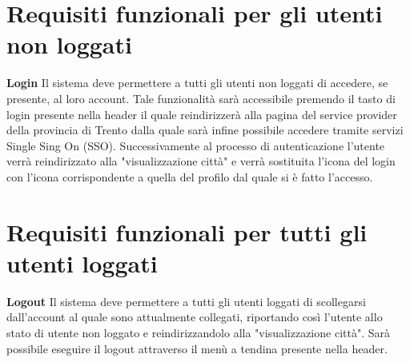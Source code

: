     \section{Requisiti funzionali per gli utenti non loggati}
        \begin{rfList}
            \rfItem \textbf{Login} Il sistema deve permettere a tutti gli utenti non loggati di accedere, se presente, al loro account. Tale funzionalità sarà accessibile premendo il tasto di login presente nella header il quale reindirizzerà alla pagina del service provider della provincia di Trento dalla quale sarà infine possibile accedere tramite servizi Single Sing On (SSO). Successivamente al processo di autenticazione l'utente verrà reindirizzato alla "visualizzazione città" e verrà sostituita l'icona del login con l'icona corrispondente a quella del profilo dal quale si è fatto l'accesso.
        \end{rfList}
    \section{Requisiti funzionali per tutti gli utenti loggati}
        \begin{rfList}
            \rfItem \textbf{Logout} Il sistema deve permettere a tutti gli utenti loggati di scollegarsi dall'account al quale sono attualmente collegati, riportando così l'utente allo stato di utente non loggato e reindirizzandolo alla "visualizzazione città". Sarà possibile eseguire il logout attraverso il menù a tendina presente nella header.
        \end{rfList}     
